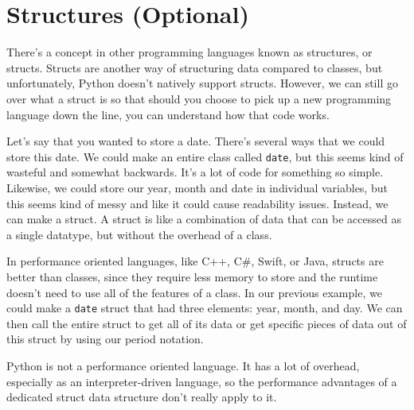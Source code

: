\section{Structures (Optional)}
There's a concept in other programming languages known as structures, or structs. Structs are another way of structuring data compared to classes, but unfortunately, Python doesn't natively support structs. However, we can still go over what a struct is so that should you choose to pick up a new programming language down the line, you can understand how that code works.\par
Let's say that you wanted to store a date. There's several ways that we could store this date. We could make an entire class called \verb|date|, but this seems kind of wasteful and somewhat backwards. It's a lot of code for something so simple. Likewise, we could store our year, month and date in individual variables, but this seems kind of messy and like it could cause readability issues. Instead, we can make a struct. A struct is like a combination of data that can be accessed as a single datatype, but without the overhead of a class.\par
In performance oriented languages, like C++, C\#, Swift, or Java, structs are better than classes, since they require less memory to store and the runtime doesn't need to use all of the features of a class. In our previous example, we could make a \verb|date| struct that had three elements: year, month, and day. We can then call the entire struct to get all of its data or get specific pieces of data out of this struct by using our period notation.\par
Python is not a performance oriented language. It has a lot of overhead, especially as an interpreter-driven language, so the performance advantages of a dedicated struct data structure don't really apply to it.\par
